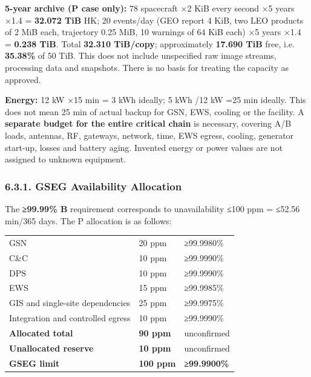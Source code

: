 \textbf{5-year archive (P case only):} 78 spacecraft ×2 KiB every second ×5 years ×1.4 = \textbf{32.072 TiB} HK; 20 events/\allowbreak{}day (GEO report 4 KiB, two LEO products of 2 MiB each, trajectory 0.25 MiB, 10 warnings of 64 KiB each) ×5 years ×1.4 = \textbf{0.238 TiB}. Total \textbf{32.310 TiB/\allowbreak{}copy}; approximately \textbf{17.690 TiB} free, i.e. \textbf{35.38\%} of 50 TiB. This does not include unspecified raw image streams, processing data and snapshots. There is no basis for treating the capacity as approved.

\textbf{Energy:} 12 kW ×15 min = 3 kWh ideally; 5 kWh /\allowbreak{}12 kW =25 min ideally. This does not mean 25 min of actual backup for GSN, EWS, cooling or the facility. A \textbf{separate budget for the entire critical chain} is necessary, covering A/\allowbreak{}B loads, antennas, RF, gateways, network, time, EWS egress, cooling, generator start-up, losses and battery aging. Invented energy or power values are not assigned to unknown equipment.

\subsubsection{6.3.1. GSEG Availability Allocation}\label{preliminary-gseg-critical-service-availability-budget}

The \textbf{≥99.99\% B} requirement corresponds to unavailability ≤100 ppm = ≤52.56 min/\allowbreak{}365 days. The P allocation is as follows:

\begingroup{}
\begin{longtable}{|P{0.33}|P{0.26}|P{0.41}|}
\hline{}
 &  & \\ \hline
\endhead
\hline\endlastfoot
GSN & 20 ppm & ≥99.9980\%\\ \hline
C\&C & 10 ppm & ≥99.9990\%\\ \hline
DPS & 10 ppm & ≥99.9990\%\\ \hline
EWS & 15 ppm & ≥99.9985\%\\ \hline
GIS and single-site dependencies & 25 ppm & ≥99.9975\%\\ \hline
Integration and controlled egress & 10 ppm & ≥99.9990\%\\ \hline
\textbf{Allocated total} & \textbf{90 ppm} & unconfirmed\\ \hline
\textbf{Unallocated reserve} & \textbf{10 ppm} & unconfirmed\\ \hline
\textbf{GSEG limit} & \textbf{100 ppm} & \textbf{≥99.9900\%}\\*
\end{longtable}
\endgroup

